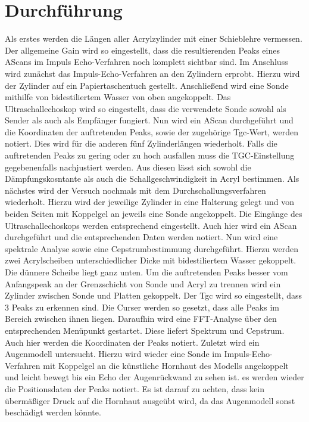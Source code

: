 
\section{Durchführung}
\label{sec:Durchführung}
Als erstes werden die Längen aller Acrylzylinder mit einer Schieblehre vermessen.
Der allgemeine Gain wird so eingestellt, dass die resultierenden Peaks eines AScans im Impuls Echo-Verfahren
noch komplett sichtbar sind.
Im Anschluss wird zunächst das Impuls-Echo-Verfahren an den Zylindern erprobt.
Hierzu wird der Zylinder auf ein Papiertaschentuch gestellt. Anschließend wird eine Sonde
 mithilfe von bidestiliertem Wasser von oben angekoppelt. Das Ultraschallechoskop
 wird so eingestellt, dass die verwendete Sonde sowohl als Sender als auch als Empfänger fungiert.
 Nun wird ein AScan durchgeführt und die Koordinaten der auftretenden Peaks, sowie der zugehörige Tgc-Wert, werden notiert.
 Dies wird für die anderen fünf Zylinderlängen wiederholt. Falls die auftretenden
 Peaks zu gering oder zu hoch ausfallen muss die TGC-Einstellung gegebenenfalls nachjustiert werden.
 Aus diesen lässt sich sowohl die Dämpfungskosntante als auch die
 Schallgeschwindigkeit in Acryl bestimmen.
 Als nächstes wird der Versuch nochmals mit dem Durchschallungsverfahren wiederholt.
 Hierzu wird der jeweilige Zylinder in eine Halterung gelegt und von beiden
 Seiten mit Koppelgel an jeweils eine Sonde angekoppelt. Die Eingänge des Ultraschallechoskops
 werden entsprechend eingestellt. Auch hier wird ein AScan durchgeführt und die
 entsprechenden Daten werden notiert.
 Nun wird eine spektrale Analyse sowie eine Cepstrumbestimmung durchgeführt. Hierzu
 werden zwei Acrylscheiben unterschiedlicher Dicke mit bidestiliertem Wasser gekoppelt.
 Die dünnere Scheibe liegt ganz unten. Um die auftretenden Peaks besser vom
 Anfangspeak an der Grenzschicht von Sonde und Acryl zu trennen wird ein Zylinder
 zwischen Sonde und Platten gekoppelt. Der Tgc wird so eingestellt, dass 3 Peaks zu erkennen sind.
 Die Curser werden so gesetzt, dass alle Peaks im Bereich zwischen ihnen liegen. Daraufhin wird eine
 FFT-Analyse über den entsprechenden Menüpunkt gestartet. Diese liefert Spektrum und Cepstrum.
 Auch hier werden die Koordinaten der Peaks notiert.
 Zuletzt wird ein Augenmodell untersucht. Hierzu wird wieder eine
 Sonde im Impuls-Echo-Verfahren mit Koppelgel an die künstliche Hornhaut des Modells angekoppelt
 und leicht bewegt bis ein Echo der Augenrückwand zu sehen ist. es werden wieder
 die Positionsdaten der Peaks notiert. Es ist darauf zu achten, dass kein übermäßiger
 Druck auf die Hornhaut ausgeübt wird, da das Augenmodell sonst beschädigt werden könnte.
